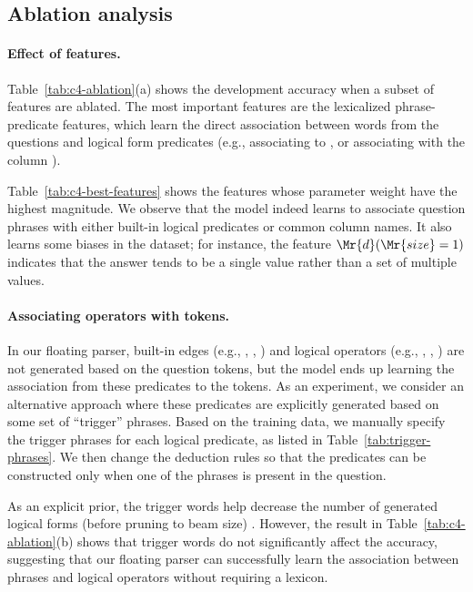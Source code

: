 \subsection{Ablation analysis}

\paragraph{Effect of features.}
Table~\ref{tab:c4-ablation}(a)
shows the development accuracy when a subset of features
are ablated.
The most important features are the 
lexicalized phrase-predicate features,
which learn the direct association between
words from the questions and logical form predicates
(e.g., associating  to ,
or associating  with the column ).

Table~\ref{tab:c4-best-features}
shows the features whose parameter weight have the highest magnitude.
We observe that the model indeed learns to associate
question phrases with either built-in logical predicates
or common column names.
It also learns some biases in the dataset;
for instance, the feature $\Mr{d}(\Mr{size} = 1)$
indicates that the answer tends to be a single value
rather than a set of multiple values.

\paragraph{Associating operators with tokens.}
In our floating parser,
built-in edges (e.g., , , )
and logical operators (e.g., , , )
are not generated based on the question tokens,
but the model ends up learning the association
from these predicates to the tokens.
As an experiment,
we consider an alternative approach where
these predicates are explicitly generated based on
some set of ``trigger'' phrases.
Based on the training data,
we manually specify the trigger phrases
for each logical predicate,
as listed in Table~\ref{tab:trigger-phrases}.
We then change the deduction rules so that
the predicates can be constructed
only when one of the phrases is present in the question.

As an explicit prior,
the trigger words help decrease the number of
generated logical forms
(before pruning to beam size)
.
However, the result in Table~\ref{tab:c4-ablation}(b)
shows that trigger words
do not significantly affect the accuracy,
suggesting that our floating parser
can successfully learn the association
between phrases and logical operators
without requiring a lexicon.

